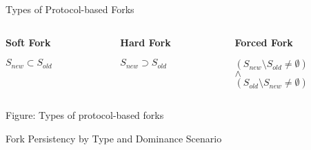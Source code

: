 \documentclass[handout]{beamer}
\begin{document}
\begin{frame}{Types of Protocol-based Forks}


\begin{columns}[T]
	\begin{column}{0.3\textwidth}
		\center		
		\textbf{Soft Fork}\\
		\vspace{0.5em}
		\begin{figure}[h]
  			\resizebox{0.9\textwidth}{!}{
			
			}
		\end{figure}
		\vspace{1em}
		$S_{new}\subset S_{old}$
	\end{column}
	\begin{column}{0.3\textwidth}
		\center
 		\textbf{Hard Fork}\\
 		\vspace{1em}
 		\begin{figure}[h]
  			\center
  			\resizebox{0.9\textwidth}{!}{
			
			}
		\end{figure}
 		\vspace{1.5em}
 		$S_{new}\supset S_{old}$
	\end{column}
		\begin{column}{0.3\textwidth}
		\center
 		\textbf{Forced Fork}\\
 		\vspace{0.5em}
 		\begin{figure}[h]
  			\center
  			\resizebox{0.9\textwidth}{!}{
			
			}
		\end{figure}
		\vspace{0.8em}
 		$(S_{new}\setminus S_{old} \neq \emptyset)$\\$\wedge$\\ $(S_{old}\setminus S_{new} \neq \emptyset)$
	\end{column}
\end{columns}

\vspace{0.5em}

\begin{center}
	Figure: Types of protocol-based forks \cite{schar2020blockchain}
\end{center}

	
\end{frame}

\begin{frame}{Fork Persistency by Type and Dominance Scenario}

	\begin{table}
		
		\caption{Persistency by fork type and scenario \cite{schar2020blockchain}}
		\label{tbl:forkpersistencies}
	\end{table}

	


	
\end{frame}
\end{document}
